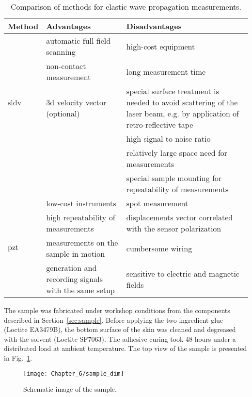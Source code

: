 \begin{table}[!htb]
	\small
	\tabcolsep=0.2cm
	\caption{\label{tab:method_comp}Comparison of methods for elastic wave propagation measurements.}
	\begin{tabular}{p{}>{\raggedright}p{}>{\raggedright \arraybackslash}p{}}
		\toprule
		\textbf{Method} &\textbf{Advantages} & \textbf{Disadvantages}\\
		\midrule
		\multirow{5}{*}{\ac{sldv}}   & \tabitem automatic full-field scanning & \tabitem high-cost equipment\\ 
		& \tabitem non-contact measurement & \tabitem long measurement time\\
		& \tabitem \ac{3d} velocity vector (optional)& \tabitem special surface treatment is needed to avoid scattering of the laser beam, e.g. by application of retro-reflective tape\\
		& & \tabitem high signal-to-noise ratio\\
		& & \tabitem relatively large space need for measurements \\
		& & \tabitem special sample mounting for repeatability of measurements\\
		\midrule
		\multirow{5}{*}{\ac{pzt}} & \tabitem low-cost instruments & \tabitem spot measurement\\
		& \tabitem high repeatability of measurements & \tabitem displacements vector correlated with the sensor polarization\\
		& \tabitem measurements on the sample in motion & \tabitem cumbersome wiring\\
		& \tabitem generation and recording signals with the same setup & \tabitem sensitive to electric and magnetic fields\\		
		\bottomrule
	\end{tabular}
\end{table}

The sample was fabricated under workshop conditions from the components described in Section~\ref{sec:sample}.
Before applying the two-ingredient glue (Loctite EA3479B), the bottom surface of the skin was cleaned and degreased with the solvent (Loctite SF7063).
The adhesive curing took 48 hours under a distributed load at ambient temperature.
The top view of the sample is presented in Fig.~\ref{fig:sample_dim}.
\begin{figure}[!htb]
	\begin{center}
		\texttt{[image: Chapter\_6/sample\_dim]}
	\end{center}
	\caption{Schematic image of the sample.}
	\label{fig:sample_dim}
\end{figure}

